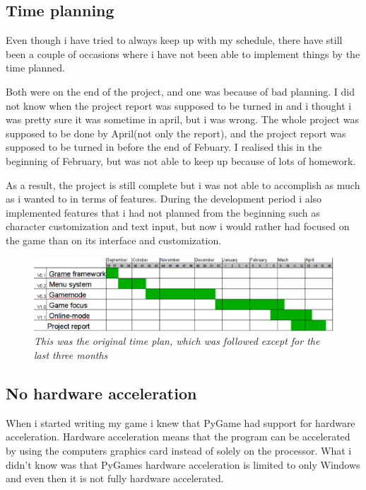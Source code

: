 \documentclass[a4paper,12pt]{article}
\begin{document}
\subsection{Time planning}

Even though i have tried to always keep up with my schedule, there have still been a couple of occasions where i have not been able to implement things by the time planned.

Both were on the end of the project, and one was because of bad planning.
I did not know when the project report was supposed to be turned in and i thought i was pretty sure it was sometime in april, but i was wrong. 
The whole project was supposed to be done by April(not only the report), and the project report was supposed to be turned in before the end of Febuary. I realised this in the beginning of February, but was not able to keep up because of lots of homework.

As a result, the project is still complete but i was not able to accomplish as much as i wanted to in terms of features.
During the development period i also implemented features that i had not planned from the beginning such as character customization and text input, but now i would rather had focused on the game than on its interface and customization.
\\

\begin{figure}[h!]
   \includegraphics[width=\textwidth]{img/gantt.eps}
    \emph{%
        This was the original time plan, which was followed except for the last three months
    }
\end{figure}

\subsection{No hardware acceleration}

When i started writing my game i knew that PyGame had support for hardware acceleration. 
Hardware acceleration means that the program can be accelerated by using the computers graphics card instead of solely on the processor.
What i didn't know was that PyGames hardware acceleration is limited to only Windows and even then it is not fully hardware accelerated.
\end{document}
